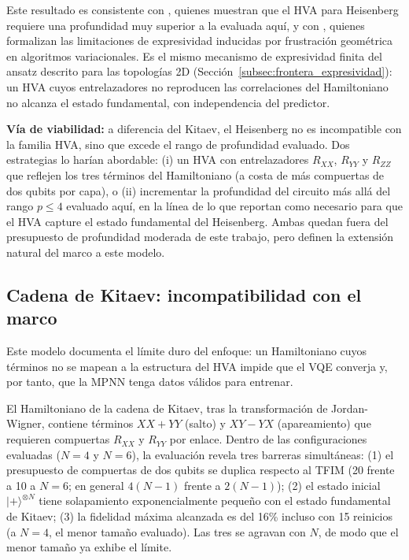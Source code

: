 \documentclass[11pt,a4paper,spanish]{book}
\begin{document}
Este resultado es consistente con \citet{wiersema2020}, quienes muestran que el HVA para Heisenberg requiere una profundidad muy superior a la evaluada aquí, y con \citet{huang2026frustration}, quienes formalizan las limitaciones de expresividad inducidas por frustración geométrica en algoritmos variacionales. Es el mismo mecanismo de expresividad finita del ansatz descrito para las topologías 2D (Sección~\ref{subsec:frontera_expresividad}): un HVA cuyos entrelazadores no reproducen las correlaciones del Hamiltoniano no alcanza el estado fundamental, con independencia del predictor.

\textbf{Vía de viabilidad:} a diferencia del Kitaev, el Heisenberg no es incompatible con la familia HVA, sino que excede el rango de profundidad evaluado. Dos estrategias lo harían abordable: (i) un HVA con entrelazadores $R_{XX}$, $R_{YY}$ y $R_{ZZ}$ que reflejen los tres términos del Hamiltoniano (a costa de más compuertas de dos qubits por capa), o (ii) incrementar la profundidad del circuito más allá del rango $p \leq 4$ evaluado aquí, en la línea de lo que \citet{wiersema2020} reportan como necesario para que el HVA capture el estado fundamental del Heisenberg. Ambas quedan fuera del presupuesto de profundidad moderada de este trabajo, pero definen la extensión natural del marco a este modelo.

\subsection{Cadena de Kitaev: incompatibilidad con el marco}

Este modelo documenta el límite duro del enfoque: un Hamiltoniano cuyos términos no se mapean a la estructura del HVA impide que el VQE converja y, por tanto, que la MPNN tenga datos válidos para entrenar.

El Hamiltoniano de la cadena de Kitaev, tras la transformación de Jordan-Wigner, contiene términos $XX + YY$ (salto) y $XY - YX$ (apareamiento) que requieren compuertas $R_{XX}$ y $R_{YY}$ por enlace. Dentro de las configuraciones evaluadas ($N = 4$ y $N = 6$), la evaluación revela tres barreras simultáneas: (1) el presupuesto de compuertas de dos qubits se duplica respecto al TFIM (20 frente a 10 a $N = 6$; en general $4(N-1)$ frente a $2(N-1)$); (2) el estado inicial $|+\rangle^{\otimes N}$ tiene solapamiento exponencialmente pequeño con el estado fundamental de Kitaev; (3) la fidelidad máxima alcanzada es del 16\% incluso con 15 reinicios (a $N = 4$, el menor tamaño evaluado). Las tres se agravan con $N$, de modo que el menor tamaño ya exhibe el límite.
\end{document}
